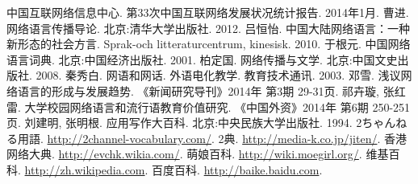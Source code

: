 \begin{thebibliography}{99}
 中国互联网络信息中心. 第33次中国互联网络发展状况统计报告. %
 2014年1月.
 曹进. 网络语言传播导论. 北京:清华大学出版社. 2012.
 吕恒怡. 中国大陆网络语言：一种新形态的社会方言. Sprak-och litteraturcentrum, kinesisk. 2010.
 于根元. 中国网络语言词典. 北京:中国经济出版社. 2001.
 柏定国. 网络传播与文学. 北京:中国文史出版社. 2008.
 秦秀白. 网语和网话. 外语电化教学. 教育技术通讯. 2003.
 邓雪. 浅议网络语言的形成与发展趋势. 《新闻研究导刊》2014年 第3期 29-31页.
 祁卉璇, 张红雷. 大学校园网络语言和流行语教育价值研究. 《中国外资》2014年 第6期 250-251页.
 刘建明, 张明根. 应用写作大百科. 北京:中央民族大学出版社. 1994.
 {\mincho 2ちゃんねる用語}. \url{http://2channel-vocabulary.com/}.
 {\mincho 2典}. \url{http://media-k.co.jp/jiten/}.
 香港网络大典. \url{http://evchk.wikia.com/}.
 萌娘百科. \url{http://wiki.moegirl.org/}.
 维基百科. \url{http://zh.wikipedia.com}.
 百度百科. \url{http://baike.baidu.com}.
\end{thebibliography}
